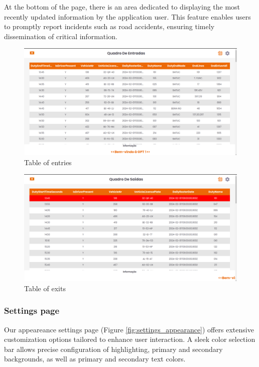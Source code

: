 \documentclass[10pt]{article}
\begin{document}
        At the bottom of the page, there is an area dedicated to displaying the most recently updated information by the application user. This feature enables users to promptly report incidents such as road accidents, ensuring timely dissemination of critical information.

        \begin{figure}[htbp]
            \centering
            \includegraphics[width=1\textwidth]{table_of_entries}
            \caption{Table of entries}
            \label{fig:table_of_entries}
        \end{figure}
        \vfill

        \begin{figure}[htbp]
            \centering
            \includegraphics[width=1\textwidth]{table_of_exits}
            \caption{Table of exits}
            \label{fig:table_of_exits}
        \end{figure}

        \subsubsection{Settings page}

        Our appeareance settings page (Figure \ref{fig:settings_appearance}) offers extensive customization options tailored to enhance user interaction. A sleek color selection bar allows precise configuration of highlighting, primary and secondary backgrounds, as well as primary and secondary text colors. 
        
\end{document}
